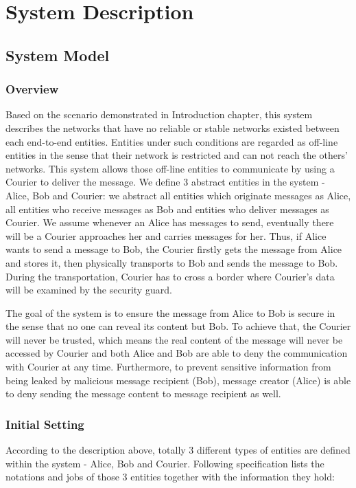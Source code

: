 \chapter{System Description}
\section{System Model}
\subsection{Overview}
Based on the scenario demonstrated in Introduction chapter, this system describes the networks that have no reliable or stable networks existed between each end-to-end entities. Entities under such conditions are regarded as off-line entities in the sense that their network is restricted and can not reach the others' networks. This system allows those off-line entities to communicate by using a Courier to deliver the message. We define 3 abstract entities in the system - Alice, Bob and Courier: we abstract all entities which originate messages as Alice, all entities who receive messages as Bob and entities who deliver messages as Courier. We assume whenever an Alice has messages to send, eventually there will be a Courier approaches her and carries messages for her. Thus, if Alice wants to send a message to Bob, the Courier firstly gets the message from Alice and stores it, then physically transports to Bob and sends the message to Bob. During the transportation, Courier has to cross a border where Courier's data will be examined by the security guard.

The goal of the system is to ensure the message from Alice to Bob is secure in the sense that no one can reveal its content but Bob. To achieve that, the Courier will never be trusted, which means the real content of the message will never be accessed by Courier and both Alice and Bob are able to deny the communication with Courier at any time. Furthermore, to prevent sensitive information from being leaked by malicious message recipient (Bob), message creator (Alice) is able to deny sending the message content to message recipient as well.

\subsection{Initial Setting}
According to the description above, totally 3 different types of entities are defined within the system - Alice, Bob and Courier. Following specification lists the notations and jobs of those 3 entities together with the information they hold:

